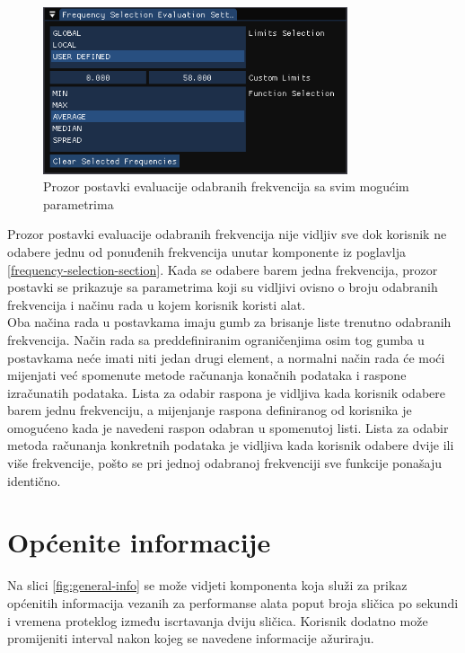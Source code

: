 \documentclass[times, utf8, diplomski]{fer}
\begin{document}
\begin{figure} [H]
	\centering
    \includegraphics[width=0.8\textwidth]{frq_sel_eval_settings.png}
    \caption{Prozor postavki evaluacije odabranih frekvencija sa svim mogućim parametrima}
    \label{fig:frq-sel-eval-settings}
\end{figure}

Prozor postavki evaluacije odabranih frekvencija nije vidljiv sve dok korisnik ne odabere jednu od ponuđenih frekvencija unutar komponente iz poglavlja \ref{frequency-selection-section}. Kada se odabere barem jedna frekvencija, prozor postavki se prikazuje sa parametrima koji su vidljivi ovisno o broju odabranih frekvencija i načinu rada u kojem korisnik koristi alat.\\

Oba načina rada u postavkama imaju gumb za brisanje liste trenutno odabranih frekvencija. Način rada sa preddefiniranim ograničenjima osim tog gumba u postavkama neće imati niti jedan drugi element, a normalni način rada će moći mijenjati već spomenute metode računanja konačnih podataka i raspone izračunatih podataka. Lista za odabir raspona je vidljiva kada korisnik odabere barem jednu frekvenciju, a mijenjanje raspona definiranog od korisnika je omogućeno kada je navedeni raspon odabran u spomenutoj listi. Lista za odabir metoda računanja konkretnih podataka je vidljiva kada korisnik odabere dvije ili više frekvencije, pošto se pri jednoj odabranoj frekvenciji sve funkcije ponašaju identično.


\section{Općenite informacije}

Na slici \ref{fig:general-info} se može vidjeti komponenta koja služi za prikaz općenitih informacija vezanih za performanse alata poput broja sličica po sekundi i vremena proteklog između iscrtavanja dviju sličica. Korisnik dodatno može promijeniti interval nakon kojeg se navedene informacije ažuriraju.
\end{document}
